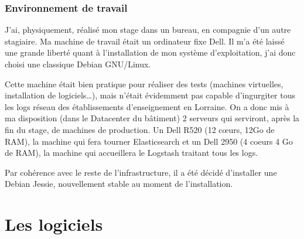 \documentclass[a4paper,12pt,one side,titlepage]{report}
\begin{document}
\section{Environnement de travail}
J'ai, physiquement, réalisé mon stage dans un bureau, en compagnie d'un autre stagiaire.
Ma machine de travail était un ordinateur fixe Dell. Il m'a été laissé une grande 
liberté quant à l'installation de mon système d'exploitation, j'ai donc choisi une 
classique Debian GNU/Linux.

Cette machine était bien pratique pour réaliser des tests (machines virtuelles, 
installation de logiciels\ldots), mais n'était évidemment pas capable d'ingurgiter 
tous les logs réseau des établissements d'enseignement en Lorraine. On a donc mis 
à ma disposition (dans le Datacenter du bâtiment) 2 serveurs qui serviront, après 
la fin du stage, de machines de production. Un Dell R520 (12 cœurs, 12Go de RAM),
la machine qui fera tourner Elasticsearch et un Dell 2950 (4 coeurs 4 Go de RAM),
la machine qui accueillera le Logstash traitant tous les logs.

Par cohérence avec le reste de l'infrastructure, il a été décidé d'installer une 
Debian Jessie, nouvellement stable au moment de l'installation.
%
%
%
%

\part{Les logiciels}
\end{document}
